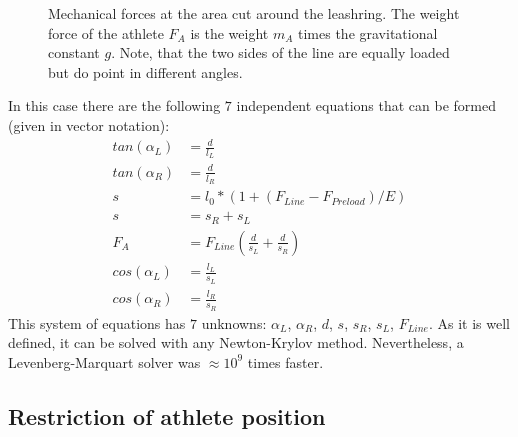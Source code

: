 \documentclass[a4paper,10pt]{scrartcl}
\begin{document}
\begin{figure}[ht]
\centering
{}
\caption{Mechanical forces at the area cut around the leashring. The weight force of the athlete $F_A$ is the weight $m_A$ times the gravitational constant $g$. Note, that the two sides of the line are equally loaded but do point in different angles.}
\label{fig::2d::forces}
\end{figure}

In this case there are the following $7$ independent equations that can be formed (given in vector notation):
\begin{align}
tan(\alpha_L) &= \frac{d}{l_L} \\
tan(\alpha_R) &= \frac{d}{l_R} \\
s &= l_0*(1+(F_{Line}-F_{Preload})/E) \\
s &= s_{R}+s_{L} \\
F_A &= F_{Line} (\frac{d}{s_{L}} + \frac{d}{s_{R}}) \\
cos(\alpha_L) &= \frac{l_L}{s_{L}} \\
cos(\alpha_R) &= \frac{l_R}{s_{R}}
\end{align}
This system of equations has $7$ unknowns: $\alpha_L$, $\alpha_R$, $d$, $s$, $s_{R}$, $s_{L}$, $F_{Line}$. As it is well defined, it can be solved with any Newton-Krylov method. Nevertheless, a Levenberg-Marquart solver was $\approx 10^9$ times faster.

\subsection{Restriction of athlete position}
\end{document}

